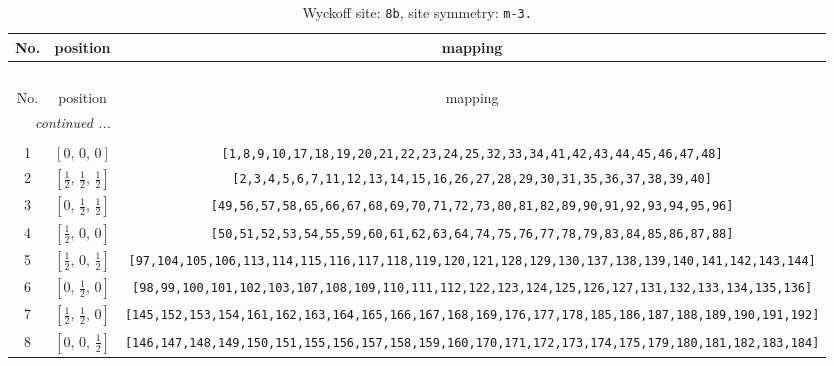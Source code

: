 \documentclass[fleqn,8pt]{jsarticle}
\begin{document}
\renewcommand{\arraystretch}{1.2}
\begin{longtable}{ccc}
\caption{Wyckoff site: {\tt 8b}, site symmetry: {\tt m-3.}}
 \\
 \hline \hline
No. & position & mapping \\ \hline \endfirsthead

\multicolumn{2}{l}{\tablename\ \thetable{}} \\
 \hline \hline
No. & position & mapping \\ \hline \endhead

 \hline \hline
\multicolumn{2}{r}{\footnotesize\it continued ...} \\ \endfoot

 \hline \hline
\multicolumn{2}{r}{} \\ \endlastfoot

1 & $\left[ 0,\, 0,\, 0 \right]$ & {\tt [1,8,9,10,17,18,19,20,21,22,23,24,25,32,33,34,41,42,43,44,45,46,47,48]} \\ \hline
2 & $\left[ \frac{1}{2},\, \frac{1}{2},\, \frac{1}{2} \right]$ & {\tt [2,3,4,5,6,7,11,12,13,14,15,16,26,27,28,29,30,31,35,36,37,38,39,40]} \\ \hline
3 & $\left[ 0,\, \frac{1}{2},\, \frac{1}{2} \right]$ & {\tt [49,56,57,58,65,66,67,68,69,70,71,72,73,80,81,82,89,90,91,92,93,94,95,96]} \\ \hline
4 & $\left[ \frac{1}{2},\, 0,\, 0 \right]$ & {\tt [50,51,52,53,54,55,59,60,61,62,63,64,74,75,76,77,78,79,83,84,85,86,87,88]} \\ \hline
5 & $\left[ \frac{1}{2},\, 0,\, \frac{1}{2} \right]$ & {\tt [97,104,105,106,113,114,115,116,117,118,119,120,121,128,129,130,137,138,139,140,141,142,143,144]} \\ \hline
6 & $\left[ 0,\, \frac{1}{2},\, 0 \right]$ & {\tt [98,99,100,101,102,103,107,108,109,110,111,112,122,123,124,125,126,127,131,132,133,134,135,136]} \\ \hline
7 & $\left[ \frac{1}{2},\, \frac{1}{2},\, 0 \right]$ & {\tt [145,152,153,154,161,162,163,164,165,166,167,168,169,176,177,178,185,186,187,188,189,190,191,192]} \\ \hline
8 & $\left[ 0,\, 0,\, \frac{1}{2} \right]$ & {\tt [146,147,148,149,150,151,155,156,157,158,159,160,170,171,172,173,174,175,179,180,181,182,183,184]} \\
\end{longtable}
\renewcommand{\arraystretch}{1.2}
\end{document}
